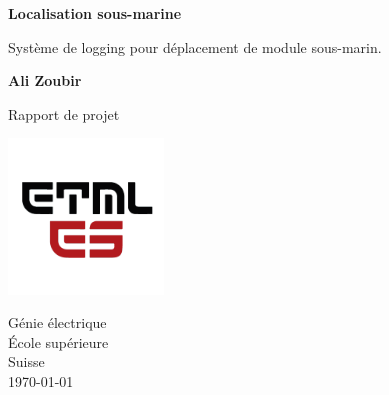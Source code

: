 \begin{titlepage}
   \begin{center}
        \vspace*{1cm}
        \LARGE
        {\Huge \textbf{Localisation sous-marine}}
        
        \vspace{0.3cm}
        Système de logging pour déplacement de module sous-marin.
            
        \vspace{1.5cm}

        \textbf{Ali Zoubir}

        \vfill
            
        Rapport de projet
            
        \vspace{0.8cm}
     
        \includegraphics[width=0.31\textwidth]{../ETML-ES-LOGO.png}

        Génie électrique\\
        École supérieure\\
        Suisse\\
        \monthyeardate\today
            
   \end{center}
\end{titlepage}